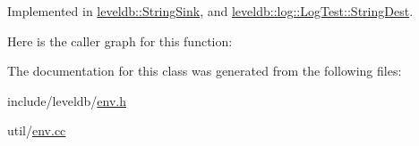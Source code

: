 Implemented in \hyperlink{classleveldb_1_1_string_sink_a77f1f2b9797737fbd89211ba0bb9a93e}{leveldb\-::\-String\-Sink}, and \hyperlink{classleveldb_1_1log_1_1_log_test_1_1_string_dest_a62d1a49e6d80f723dc28e8dca944b39a}{leveldb\-::log\-::\-Log\-Test\-::\-String\-Dest}.



Here is the caller graph for this function\-:




The documentation for this class was generated from the following files\-:\begin{DoxyCompactItemize}
\item 
include/leveldb/\hyperlink{env_8h}{env.\-h}\item 
util/\hyperlink{env_8cc}{env.\-cc}\end{DoxyCompactItemize}
